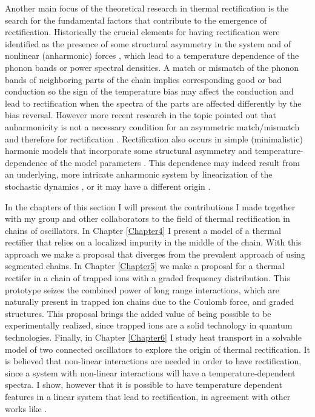 Another main focus of the theoretical research in thermal rectification is the search for the fundamental factors that contribute to the emergence of rectification. Historically the crucial elements for having rectification were identified as the presence of some structural asymmetry in the system and of nonlinear (anharmonic) forces \cite{Zeng2008,Katz2016,Li2008,Hu2006,Benenti2016,Li2012,Segal2005,Segal2005b}, which lead to a temperature dependence of the phonon bands or power spectral densities. A match or mismatch of the phonon bands of neighboring parts of the chain implies corresponding good or bad conduction so the
sign of the temperature bias may affect the conduction and lead to rectification when the spectra of the parts are affected differently by the bias reversal. However more recent research in the topic pointed out  that anharmonicity is not a necessary condition for an asymmetric match/mismatch and therefore for rectification \cite{Pereira2017}. Rectification also occurs in simple (minimalistic) harmonic models that incorporate some structural asymmetry and temperature-dependence of the model parameters \cite{Pereira2017}. This dependence may indeed result from an underlying, more intricate  anharmonic system by linearization of the stochastic dynamics \cite{Pereira2017,Pereira2019}, or it may have a different origin \cite{Simon2019}.

In the chapters of this section I will present the contributions I made together with my group and other collaborators to the field of thermal rectification in chains of oscillators. In Chapter \ref{Chapter4} I present a model of a thermal rectifier that relies on a localized impurity in the middle of the chain. With this approach we make a proposal that diverges from the prevalent approach of using segmented chains. In Chapter \ref{Chapter5} we make a proposal for a thermal rectifer in a chain of trapped ions with a graded frequency distribution. This prototype seizes the combined power of long range interactions, which are naturally present in trapped ion chains due to the Coulomb force, and graded structures. This proposal brings the added value of being possible to be experimentally realized, since trapped ions are a solid technology in quantum technologies. Finally, in Chapter \ref{Chapter6} I study heat transport in a solvable model of two connected oscillators to explore the origin of thermal rectification. It is believed that non-linear interactions are needed in order to have rectification, since a system with non-linear interactions will have a temperature-dependent spectra. I show, however that it is possible to have temperature dependent features in a linear system that lead to rectification, in agreement with other works like \cite{Pereira2017}.
